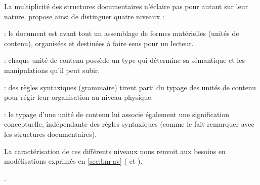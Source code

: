 La multiplicité des structures documentaires n'éclaire pas pour autant sur leur nature.
\cite[p.191-192]{bachimont:icc} propose ainsi de distinguer quatre niveaux :
\begin{liste}
 	\item {} : le document est avant tout un assemblage de formes matérielles (unités de contenu), organisées et destinées à faire sens pour un lecteur.

 	\item {} : chaque unité de contenu possède un type qui détermine sa sémantique et les manipulations qu'il peut subir.
 
 	\item {} : des règles syntaxiques (grammaire) tirent parti du typage des unités de contenu pour régir leur organisation au niveau physique. 

 	\item {} : le typage d'une unité de contenu lui associe également une signification conceptuelle, indépendante des règles syntaxiques (comme \citeauthor{Prie2000} le fait remarquer avec les structures documentaires).
\end{liste}


La caractérisation de ces différents niveaux nous renvoit aux besoins en modélisations exprimés en \ref{sec:bm-av} ( et ).




 . 


